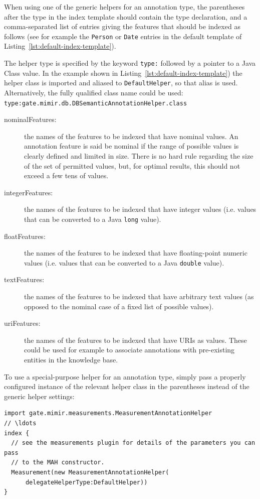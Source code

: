 When using one of the generic helpers for an annotation type, the parentheses
after the type in the index template should contain the type declaration, and a
comma-separated list of entries giving the features that should be indexed as
follows (see for example the \lstinline!Person! or \lstinline!Date! entries in
the default template of Listing~\ref{lst:default-index-template}).

The helper type is specified by the keyword {\tt type:} followed by a pointer to
a Java Class value. In the example shown in
Listing~\ref{lst:default-index-template}) the helper class is imported and
aliased to {\tt DefaultHelper}, so that alias is used. Alternatively, the fully
qualified class name could be used:\\
\verb!type:gate.mimir.db.DBSemanticAnnotationHelper.class!

\begin{description}
\item[nominalFeatures:] the names of the features to be indexed that have
  nominal values. An annotation feature is said be nominal if the range of
  possible values is clearly defined and limited in size. There is no hard rule
  regarding the size of the set of permitted values, but, for optimal results,
  this should not exceed a few tens of values.
\item[integerFeatures:] the names of the features to be indexed that have
  integer values (i.e. values that can be converted to a Java {\tt long}
  value).
\item[floatFeatures:] the names of the features to be indexed that have
  floating-point numeric values (i.e. values that can be converted to a Java
  {\tt double} value).
\item[textFeatures:] the names of the features to be indexed that have
  arbitrary text values (as opposed to the nominal case of a fixed list of
  possible values).
\item[uriFeatures:] the names of the features to be indexed that have
  URIs as values. These could be used for example to associate annotations with
  pre-existing entities in the knowledge base.
\end{description}


To use a special-purpose helper for an annotation type, simply pass a properly
configured instance of the relevant helper class in the parentheses instead of
the generic helper settings:
\begin{lstlisting}[texcl]
import gate.mimir.measurements.MeasurementAnnotationHelper
// \ldots
index {
  // see the measurements plugin for details of the parameters you can pass
  // to the MAH constructor.
  Measurement(new MeasurementAnnotationHelper(
      delegateHelperType:DefaultHelper))
}
\end{lstlisting}

